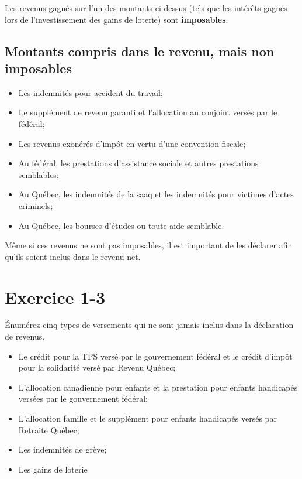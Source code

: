 \begin{note}
	Les revenus gagnés sur l'un des montants ci-dessus (tels que les intérêts gagnés lors de l'investissement des gains de loterie) sont \textbf{imposables}.
\end{note}


\subsection{Montants compris dans le revenu, mais non imposables}
\begin{itemize}
	\item Les indemnités pour accident du travail;
	\item Le supplément de revenu garanti et l'allocation au conjoint versés par le fédéral;
	\item Les revenus exonérés d'impôt en vertu d'une convention fiscale;
	\item Au fédéral, les prestations d'assistance sociale et autres prestations semblables;
	\item Au Québec, les indemnités de la \acrfull{saaq} et les indemnités pour victimes d'actes criminels;
	\item Au Québec, les bourses d'études ou toute aide semblable.
\end{itemize}
\begin{note}
	Même si ces revenus ne sont pas imposables, il est important de les déclarer afin qu'ils soient inclus dans le revenu net.
\end{note}



\section{Exercice 1-3}
\setcounter{question}{0}
\begin{question}
	Énumérez cinq types de versements qui ne sont jamais inclus dans la déclaration de revenus.
\end{question}
\begin{itemize}
	\item Le crédit pour la TPS versé par le gouvernement fédéral et le crédit d'impôt pour la solidarité versé par Revenu Québec;
	\item L'allocation canadienne pour enfants et la prestation pour enfants handicapés versées par le gouvernement fédéral;
	\item L'allocation famille et le supplément pour enfants handicapés versés par Retraite Québec;
	\item Les indemnités de grève;
	\item Les gains de loterie
\end{itemize}

